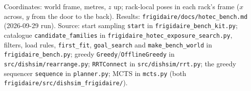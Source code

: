 \documentclass[10pt]{article}
\begin{document}
{\footnotesize Coordinates: world frame, metres, $z$ up; rack-local poses in each rack's frame ($x$ across, $y$ from the door to the back). Results: \texttt{frigidaire/docs/hotec\_bench.md} (2026-09-29 run). Source: start sampling \texttt{start} in \texttt{frigidaire\_bench\_kit.py}; catalogue \texttt{candidate\_families} in \texttt{frigidaire\_hotec\_exposure\_search.py}, filters, load rules, \texttt{first\_fit}, \texttt{goal\_search} and \texttt{make\_bench\_world} in \texttt{frigidaire\_bench.py}; greedy \texttt{Greedy}/\texttt{OfflineGreedy} in \texttt{src/dishsim/rearrange.py}; \texttt{RRTConnect} in \texttt{src/dishsim/rrt.py}; the greedy sequencer \texttt{sequence} in \texttt{planner.py}; MCTS in \texttt{mcts.py} (both \texttt{frigidaire/src/dishsim\_frigidaire/}).\par}
\end{document}
